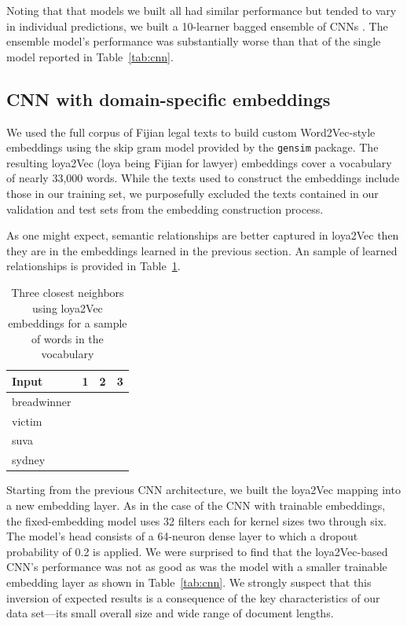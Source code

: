 \documentclass[twocolumn,10pt]{wmrDoc}
\begin{document}
Noting that that models we built all had similar performance but tended to vary in individual predictions, we built a 10-learner bagged ensemble of CNNs \cite{goodfellow}.  The ensemble model's performance was substantially worse than that of the single model reported in Table~\ref{tab:cnn}. 

\subsection{CNN with domain-specific embeddings}
We used the full corpus of Fijian legal texts to build custom Word2Vec-style embeddings using the skip gram model provided by the \verb|gensim| package.  The resulting loya2Vec (loya being Fijian for lawyer) embeddings cover a vocabulary of nearly 33,000 words.  While the texts used to construct the embeddings include those in our training set, we purposefully excluded the texts contained in our validation and test sets from the embedding construction process.

As one might expect, semantic relationships are better captured in loya2Vec then they are in the embeddings learned in the previous section.  An sample of learned relationships is provided in Table~\ref{tab:loya2vec}.

\begin{table}
 \caption{Three closest neighbors using loya2Vec embeddings for a sample of words in the vocabulary}
  \centering
  \begin{tabular}{llll}
    \toprule
    Input       &  1 & 2 & 3\\
    \midrule
    breadwinner &  \\
    victim      &  \\
    suva        &  \\
    sydney      &  \\
    \bottomrule
  \end{tabular}
  \label{tab:loya2vec}
\end{table}

Starting from the previous CNN architecture, we built the loya2Vec mapping into a new embedding layer.  As in the case of the CNN with trainable embeddings, the fixed-embedding model uses 32 filters each for kernel sizes two through six.  The model’s head consists of a 64-neuron dense layer to which a dropout probability of 0.2 is applied.  We were surprised to find that the loya2Vec-based CNN’s performance was not as good as was the model with a smaller trainable embedding layer as shown in Table~\ref{tab:cnn}.  We strongly suspect that this inversion of expected results is a consequence of the key characteristics of our data set---its small overall size and wide range of document lengths.
\end{document}
